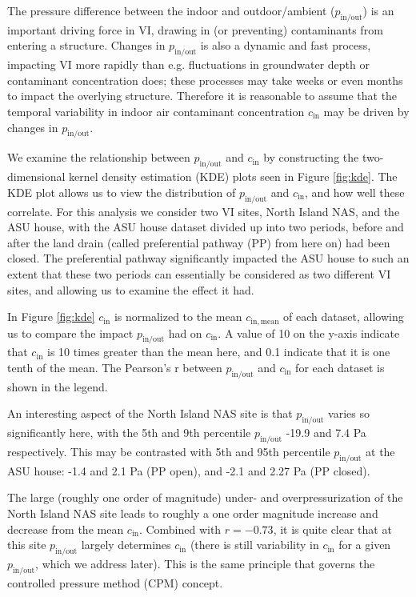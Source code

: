 \documentclass[journal=esthag,manuscript=article]{achemso}
\begin{document}
The pressure difference between the indoor and outdoor/ambient ($p_\mathrm{in/out}$) is an important driving force in VI, drawing in (or preventing) contaminants from entering a structure. %
Changes in $p_\mathrm{in/out}$ is also a dynamic and fast process, impacting VI more rapidly than e.g. fluctuations in groundwater depth or contaminant concentration does; these processes may take weeks or even months to impact the overlying structure.
Therefore it is reasonable to assume that the temporal variability in indoor air contaminant concentration $c_\mathrm{in}$ may be driven by changes in $p_\mathrm{in/out}$.

We examine the relationship between $p_\mathrm{in/out}$ and $c_\mathrm{in}$  by constructing the two-dimensional kernel density estimation (KDE) plots seen in Figure \ref{fig:kde}.
The KDE plot allows us to view the distribution of $p_\mathrm{in/out}$ and $c_\mathrm{in}$, and how well these correlate.
For this analysis we consider two VI sites, North Island NAS, and the ASU house, with the ASU house dataset divided up into two periods, before and after the land drain (called preferential pathway (PP) from here on) had been closed.
The preferential pathway significantly impacted the ASU house to such an extent that these two periods can essentially be considered as two different VI sites, and allowing us to examine the effect it had.

In Figure \ref{fig:kde} $c_\mathrm{in}$ is normalized to the mean $c_\mathrm{in,mean}$ of each dataset, allowing us to compare the impact $p_\mathrm{in/out}$ had on $c_\mathrm{in}$.
A value of 10 on the y-axis indicate that $c_\mathrm{in}$ is 10 times greater than the mean here, and 0.1 indicate that it is one tenth of the mean.
The Pearson's r between $p_\mathrm{in/out}$ and $c_\mathrm{in}$ for each dataset is shown in the legend.

An interesting aspect of the North Island NAS site is that $p_\mathrm{in/out}$ varies so significantly here, with the 5th and 9th percentile $p_\mathrm{in/out}$ -19.9 and 7.4 Pa respectively.
This may be contrasted with 5th and 95th percentile $p_\mathrm{in/out}$ at the ASU house: -1.4 and 2.1 Pa (PP open), and -2.1 and 2.27 Pa (PP closed).

The large (roughly one order of magnitude) under- and overpressurization of the North Island NAS site leads to roughly a one order magnitude increase and decrease from the mean $c_\mathrm{in}$.
Combined with $r=-0.73$, it is quite clear that at this site $p_\mathrm{in/out}$ largely determines $c_\mathrm{in}$ (there is still variability in $c_\mathrm{in}$ for a given $p_\mathrm{in/out}$, which we address later).
This is the same principle that governs the controlled pressure method (CPM) concept.
\end{document}
